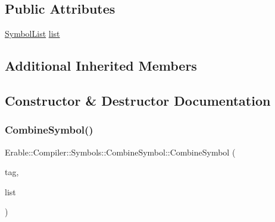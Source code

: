 \subsection*{Public Attributes}
\begin{DoxyCompactItemize}
\item 
\mbox{\hyperlink{namespace_erable_1_1_compiler_1_1_symbols_a63e8157d2f729d4689d27bacad42f8ed}{Symbol\+List}} \mbox{\hyperlink{struct_erable_1_1_compiler_1_1_symbols_1_1_combine_symbol_a5bacd166436d523d163b11fb0d343b2e}{list}}
\end{DoxyCompactItemize}
\subsection*{Additional Inherited Members}


\subsection{Constructor \& Destructor Documentation}
\mbox{\label{struct_erable_1_1_compiler_1_1_symbols_1_1_combine_symbol_ab40f569d4abd2550a7396a2fb6354ad2}} 
\subsubsection{\texorpdfstring{CombineSymbol()}{CombineSymbol()}\hspace{0.1cm}{\footnotesize\ttfamily [1/2]}}
{\footnotesize\ttfamily Erable\+::\+Compiler\+::\+Symbols\+::\+Combine\+Symbol\+::\+Combine\+Symbol (\begin{DoxyParamCaption}\item[{std\+::string}]{tag,  }\item[{\mbox{\hyperlink{namespace_erable_1_1_compiler_1_1_symbols_a63e8157d2f729d4689d27bacad42f8ed}{Symbol\+List}}}]{list }\end{DoxyParamCaption})}

\mbox{\label{struct_erable_1_1_compiler_1_1_symbols_1_1_combine_symbol_a8272aef11b5c378ba34f3ee54836a354}} 
